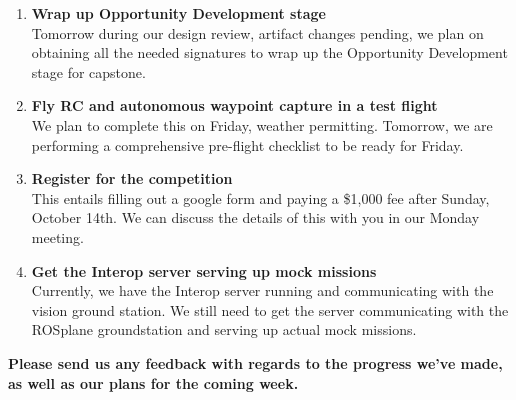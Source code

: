 \documentclass[]{../auvsi_doc}
\begin{document}
\begin{enumerate}
\item \textbf{Wrap up Opportunity Development stage}\\
Tomorrow during our design review, artifact changes pending, we plan on obtaining all the needed signatures to wrap up the Opportunity Development stage for capstone.
\item \textbf{Fly RC and autonomous waypoint capture in a test flight}\\
We plan to complete this on Friday, weather permitting. Tomorrow, we are performing a comprehensive pre-flight checklist to be ready for Friday.
\item \textbf{Register for the competition}\\
This entails filling out a google form and paying a \$1,000 fee after Sunday, October 14th. We can discuss the details of this with you in our Monday meeting.
\item \textbf{Get the Interop server serving up mock missions}\\
Currently, we have the Interop server running and communicating with the vision ground station. We still need to get the server communicating with the ROSplane groundstation and serving up actual mock missions.
\end{enumerate}

\textbf{Please send us any feedback with regards to the progress we've made, as well as our plans for the coming week.}
\end{document}
